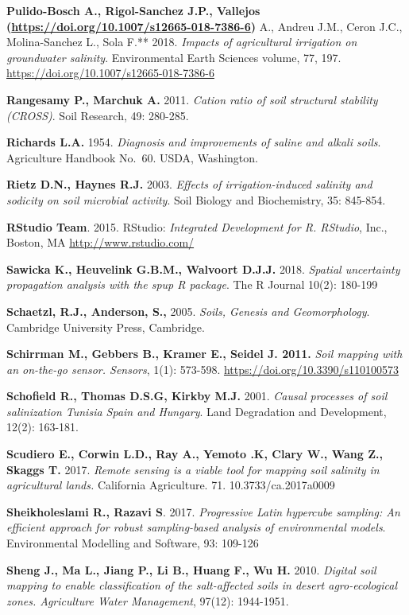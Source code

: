 \documentclass[
  10pt,
  b5paper,
]{book}
\begin{document}
\textbf{Pulido-Bosch A., Rigol-Sanchez J.P., Vallejos (\url{https://doi.org/10.1007/s12665-018-7386-6}) }A., Andreu J.M., Ceron J.C., Molina-Sanchez L., Sola F.** 2018. \emph{Impacts of agricultural irrigation on groundwater salinity}. Environmental Earth Sciences volume, 77, 197. \url{https://doi.org/10.1007/s12665-018-7386-6}

\textbf{Rangesamy P., Marchuk A.} 2011. \emph{Cation ratio of soil structural stability (CROSS)}. Soil Research, 49: 280-285.

\textbf{Richards L.A.} 1954. \emph{Diagnosis and improvements of saline and alkali soils}. Agriculture Handbook No.~60. USDA, Washington.

\textbf{Rietz D.N., Haynes R.J.} 2003. \emph{Effects of irrigation-induced salinity and sodicity on soil microbial activity}. Soil Biology and Biochemistry, 35: 845-854.

\textbf{RStudio Team}. 2015. RStudio: \emph{Integrated Development for R. RStudio}, Inc., Boston, MA \url{http://www.rstudio.com/}

\textbf{Sawicka K., Heuvelink G.B.M., Walvoort D.J.J.} 2018. \emph{Spatial uncertainty propagation analysis with the spup R package}. The R Journal 10(2): 180-199

\textbf{Schaetzl, R.J., Anderson, S.,} 2005. \emph{Soils, Genesis and Geomorphology}. Cambridge University Press, Cambridge.

\textbf{Schirrman M., Gebbers B., Kramer E., Seidel J. 2011.} \emph{Soil mapping with an on-the-go sensor. Sensors}, 1(1): 573-598. \url{https://doi.org/10.3390/s110100573}

\textbf{Schofield R., Thomas D.S.G, Kirkby M.J.} 2001. \emph{Causal processes of soil salinization Tunisia Spain and Hungary}. Land Degradation and Development, 12(2): 163-181.

\textbf{Scudiero E., Corwin L.D., Ray A., Yemoto .K, Clary W., Wang Z., Skaggs T.} 2017. \emph{Remote sensing is a viable tool for mapping soil salinity in agricultural lands.} California Agriculture. 71. 10.3733/ca.2017a0009

\textbf{Sheikholeslami R., Razavi S}. 2017. \emph{Progressive Latin hypercube sampling: An efficient approach for robust sampling-based analysis of environmental models}. Environmental Modelling and Software, 93: 109-126

\textbf{Sheng J., Ma L., Jiang P., Li B., Huang F., Wu H.} 2010. \emph{Digital soil mapping to enable classification of the salt-affected soils in desert agro-ecological zones. Agriculture Water Management}, 97(12): 1944-1951.
\end{document}

